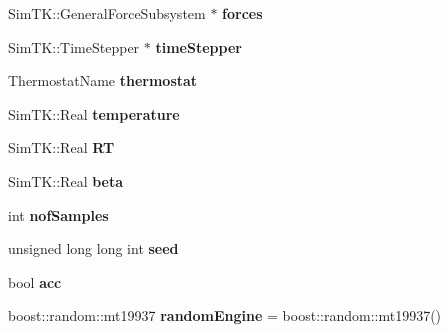 \begin{DoxyCompactItemize}
\item 
Sim\+T\+K\+::\+General\+Force\+Subsystem $\ast$ {\bfseries forces}\hypertarget{classSampler_ac6fd8324ef573b7fd765ae572ee06343}{}\label{classSampler_ac6fd8324ef573b7fd765ae572ee06343}

\item 
Sim\+T\+K\+::\+Time\+Stepper $\ast$ {\bfseries time\+Stepper}\hypertarget{classSampler_a25ad4e02e2fcb4c8aaf914a678dee128}{}\label{classSampler_a25ad4e02e2fcb4c8aaf914a678dee128}

\item 
Thermostat\+Name {\bfseries thermostat}\hypertarget{classSampler_a464e1c642da90803d760265d2904c765}{}\label{classSampler_a464e1c642da90803d760265d2904c765}

\item 
Sim\+T\+K\+::\+Real {\bfseries temperature}\hypertarget{classSampler_a5bdd4b90cf4dec04e4dc8cd900cc9857}{}\label{classSampler_a5bdd4b90cf4dec04e4dc8cd900cc9857}

\item 
Sim\+T\+K\+::\+Real {\bfseries RT}\hypertarget{classSampler_a6ec4ff10320afbba1db255f691bcdbbd}{}\label{classSampler_a6ec4ff10320afbba1db255f691bcdbbd}

\item 
Sim\+T\+K\+::\+Real {\bfseries beta}\hypertarget{classSampler_a67faf89e26a9f4ed809c2ccf49023ad5}{}\label{classSampler_a67faf89e26a9f4ed809c2ccf49023ad5}

\item 
int {\bfseries nof\+Samples}\hypertarget{classSampler_aea870fef79a9d102e3da843b1455fbc3}{}\label{classSampler_aea870fef79a9d102e3da843b1455fbc3}

\item 
unsigned long long int {\bfseries seed}\hypertarget{classSampler_aaa55f25f620ba200654c52d1a50d27de}{}\label{classSampler_aaa55f25f620ba200654c52d1a50d27de}

\item 
bool {\bfseries acc}\hypertarget{classSampler_a97d8bc64196e61c2b86ed0d4fc8c669c}{}\label{classSampler_a97d8bc64196e61c2b86ed0d4fc8c669c}

\item 
boost\+::random\+::mt19937 {\bfseries random\+Engine} = boost\+::random\+::mt19937()\hypertarget{classSampler_a3abf6a00b9395c28ec428d9ca89794e0}{}\label{classSampler_a3abf6a00b9395c28ec428d9ca89794e0}


\end{DoxyCompactItemize}

